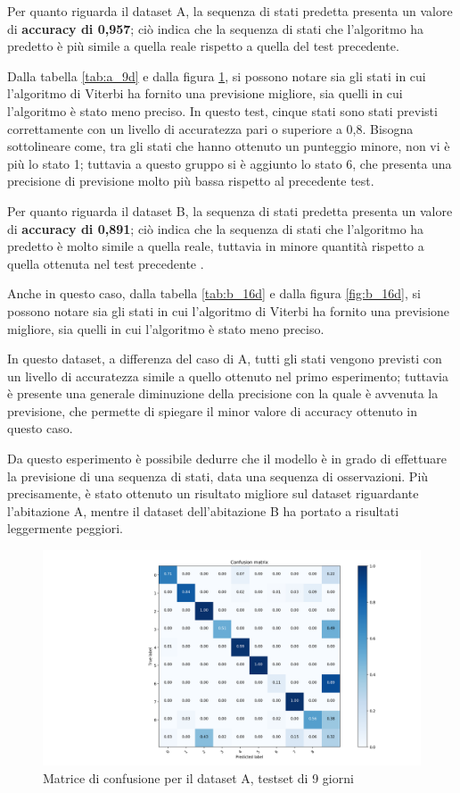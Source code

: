 \documentclass[10pt,a4paper]{article}
\begin{document}
	Per quanto riguarda il dataset A, la sequenza di stati predetta presenta un valore di \textbf{accuracy di 0,957}; ciò indica che la sequenza di stati che l'algoritmo ha predetto è più simile a quella reale rispetto a quella del test precedente.
	
	Dalla tabella \ref{tab:a_9d} e dalla figura \ref{fig:a_9d}, si possono notare sia gli stati in cui l'algoritmo di Viterbi ha fornito una previsione migliore, sia quelli in cui l'algoritmo è stato meno preciso. In questo test, cinque stati sono stati previsti correttamente con un livello di accuratezza pari o superiore a 0,8. Bisogna sottolineare come, tra gli stati che hanno ottenuto un punteggio minore, non vi è più lo stato 1; tuttavia a questo gruppo si è aggiunto lo stato 6, che presenta una precisione di previsione molto più bassa rispetto al precedente test.
	
    Per quanto riguarda il dataset B, la sequenza di stati predetta presenta un valore di \textbf{accuracy di 0,891}; ciò indica che la sequenza di stati che l'algoritmo ha predetto è molto simile a quella reale, tuttavia in minore quantità rispetto a quella ottenuta nel test precedente .
    
    Anche in questo caso, dalla tabella \ref{tab:b_16d} e dalla figura \ref{fig:b_16d}, si possono notare sia gli stati in cui l'algoritmo di Viterbi ha fornito una previsione migliore, sia quelli in cui l'algoritmo è stato meno preciso.
    
    In questo dataset, a differenza del caso di A, tutti gli stati vengono previsti con un livello di accuratezza simile a quello ottenuto nel primo esperimento; tuttavia è presente una generale diminuzione della precisione con la quale è avvenuta la previsione, che permette di spiegare il minor valore di accuracy ottenuto in questo caso.
    
    Da questo esperimento è possibile dedurre che il modello è in grado di effettuare la previsione di una sequenza di stati, data una sequenza di osservazioni. Più precisamente, è stato ottenuto un risultato migliore sul dataset riguardante l'abitazione A, mentre il dataset dell'abitazione B ha portato a risultati leggermente peggiori.
	
	
	
	\begin{figure}[!htbp]
	\includegraphics[width=\linewidth]{immagini/confusion_matrix/a_10d.png}
	\caption{Matrice di confusione per il dataset A, testset di 9 giorni}
	\label{fig:a_9d}
	\end{figure}
	
\end{document}
